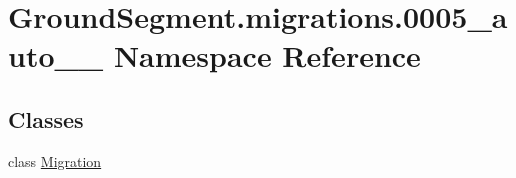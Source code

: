 \hypertarget{namespace_ground_segment_1_1migrations_1_10005__auto__20161126__1606}{}\section{Ground\+Segment.\+migrations.0005\+\_\+auto\+\_\+\_ Namespace Reference}
\label{namespace_ground_segment_1_1migrations_1_10005__auto__20161126__1606}
\subsection*{Classes}
\begin{DoxyCompactItemize}
\item 
class \hyperlink{class_ground_segment_1_1migrations_1_10005__auto__20161126__1606_1_1_migration}{Migration}
\end{DoxyCompactItemize}
